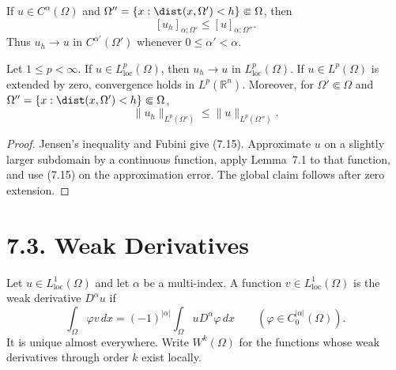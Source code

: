 If $u\in C^\alpha(\Omega)$ and
$\Omega''=\{x:\dist(x,\Omega')<h\}\Subset\Omega$, then
\begin{equation}
\tag{7.14}
[u_h]_{\alpha;\Omega'}\leq [u]_{\alpha;\Omega''}.
\end{equation}
Thus $u_h\to u$ in $C^{\alpha'}(\Omega')$ whenever
$0\leq\alpha'<\alpha$.

\begin{lemma}
\label{gt:lem-sobolev-regularization-lp}
Let $1\leq p<\infty$. If $u\in L^p_{\mathrm{loc}}(\Omega)$, then
$u_h\to u$ in $L^p_{\mathrm{loc}}(\Omega)$. If $u\in L^p(\Omega)$ is
extended by zero, convergence holds in $L^p(\mathbb R^n)$.
Moreover, for $\Omega'\Subset\Omega$ and
$\Omega''=\{x:\dist(x,\Omega')<h\}\Subset\Omega$,
\begin{equation}
\tag{7.15}
\|u_h\|_{L^p(\Omega')}\leq\|u\|_{L^p(\Omega'')}.
\end{equation}
\end{lemma}
\begin{proof}
\sketch Jensen's inequality and Fubini give (7.15). Approximate $u$ on a
slightly larger subdomain by a continuous function, apply Lemma~7.1 to that
function, and use (7.15) on the approximation error. The global claim follows
after zero extension.
\end{proof}

\section*{7.3. Weak Derivatives}

\begin{definition}
\label{gt:def-sobolev-weak-derivative}
Let $u\in L^1_{\mathrm{loc}}(\Omega)$ and let $\alpha$ be a multi-index.
A function $v\in L^1_{\mathrm{loc}}(\Omega)$ is the weak derivative
$D^\alpha u$ if
\begin{equation}
\tag{7.16}
\int_\Omega \varphi v\,dx
=(-1)^{|\alpha|}\int_\Omega uD^\alpha\varphi\,dx
\qquad(\varphi\in C_0^{|\alpha|}(\Omega)).
\end{equation}
It is unique almost everywhere. Write $W^k(\Omega)$ for the functions whose
weak derivatives through order $k$ exist locally.
\end{definition}

